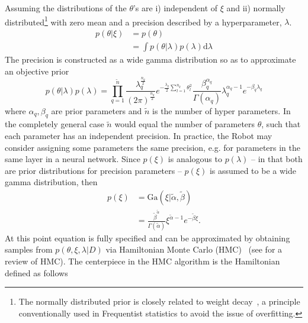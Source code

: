 Assuming the distributions of the $\theta$'s are i) independent of $\xi$ and ii) normally distributed\footnote{The normally distributed prior is closely related to weight decay~\citep{Plaut1986}, a principle conventionally used in Frequentist statistics to avoid the issue of overfitting.} with zero mean and a precision described by a hyperparameter, $\lambda$. 	 
\begin{equation}
	\begin{split}
		p(\theta|\xi) & = p(\theta)\\
		& = \int p(\theta|\lambda)p(\lambda) \mathrm{d}\lambda
	\end{split}
	\label{eq:prior1}
\end{equation}
The precision is constructed as a wide gamma distribution so as to approximate an objective prior
\begin{equation}
	p(\theta|\lambda)p(\lambda)
	= \prod_{q=1}^{\tilde{n}} \frac{\lambda_q^\frac{n_q}{2}}{(2\pi)^\frac{n_q}{2}}e^{-\frac{\lambda_q}{2}\sum_{l=1}^{n_q}\theta_l^2}\frac{\beta_q^{\alpha_q}}{\Gamma(\alpha_q)}\lambda_q^{\alpha_q-1}e^{-\beta_q \lambda_q}
	\label{eq:prior}
\end{equation}
where $\alpha_q,\beta_q$ are prior parameters and $\tilde{n}$ is the number of hyper parameters. In the completely general case $\tilde{n}$ would equal the number of parameters $\theta$, such that each parameter has an independent precision. In practice, the Robot may consider assigning some parameters the same precision, e.g. for parameters in the same layer in a neural network. Since $p(\xi)$ is analogous to $p(\lambda)$ -- in that both are prior distributions for precision parameters -- $p(\xi)$ is assumed to be a wide gamma distribution, then
\begin{equation}
	\begin{split}
		p(\xi) & = \text{Ga}(\xi|\tilde{\alpha},\tilde{\beta})\\
		& =\frac{\tilde{\beta}^{\tilde{\alpha}}}{\Gamma(\tilde{\alpha})}\xi^{\tilde{\alpha}-1}e^{-\tilde{\beta} \xi}.
	\end{split}
	\label{p7}
\end{equation}
At this point equation  is fully specified and can be approximated by obtaining samples from $p(\theta,\xi,\lambda|D)$ via Hamiltonian Monte Carlo (HMC)~\citep{Hammersley1964,Duane:1987de,Neal:1996,Neal2012} (see  for a review of HMC). The centerpiece in the HMC algorithm is the Hamiltonian defined as follows~\citep{Neal:1996,Neal2012}
